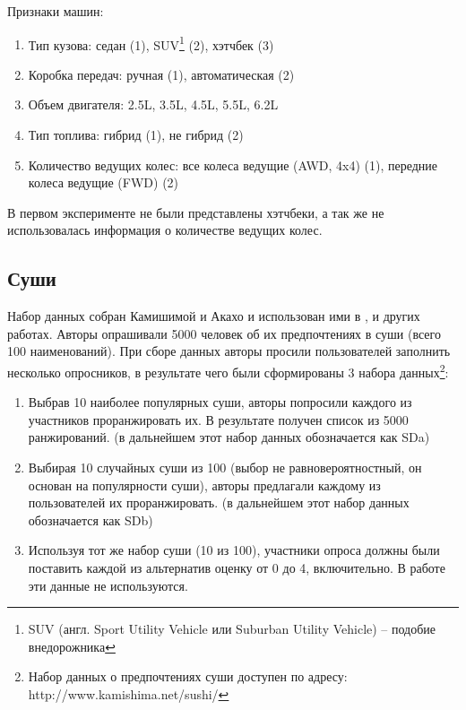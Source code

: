 		\vspace{1em}
		
		\noindent Признаки машин:
		\vspace{-0.7em}
		\begin{enumerate}[itemsep=-1.5mm]
			\item Тип кузова: седан (1), SUV\footnote{SUV (англ. Sport Utility Vehicle или Suburban Utility Vehicle) – подобие внедорожника} (2), хэтчбек (3)
			\item Коробка передач: ручная (1), автоматическая (2)
			\item Объем двигателя: 2.5L, 3.5L, 4.5L, 5.5L, 6.2L
			\item Тип топлива: гибрид (1), не гибрид (2)
			\item Количество ведущих колес: все колеса ведущие (AWD, 4x4) (1), передние колеса ведущие (FWD) (2)
		\end{enumerate} 
		В первом эксперименте не были представлены хэтчбеки, а так же не использовалась информация о количестве ведущих колес.
	
	\subsection{Суши}
		Набор данных собран Камишимой и Акахо и использован ими в \cite{Kamishima:2003}, \cite{Kamishima:2006} и других работах. Авторы опрашивали 5000 человек об их предпочтениях в суши (всего 100 наименований). При сборе данных авторы просили пользователей заполнить несколько опросников, в результате чего были сформированы 3 набора данных\footnote{Набор данных о предпочтениях суши доступен по адресу: http://www.kamishima.net/sushi/}:
		\begin{enumerate}[itemsep=-1.5mm]
			\item Выбрав 10 наиболее популярных суши, авторы попросили каждого из участников проранжировать их. В результате получен список из 5000 ранжирований. (в дальнейшем этот набор данных обозначается как SDa)
			\item Выбирая 10 случайных суши из 100 (выбор не равновероятностный, он основан на популярности суши), авторы предлагали каждому из пользователей их проранжировать. (в дальнейшем этот набор данных обозначается как SDb)
			\item Используя тот же набор суши (10 из 100), участники опроса должны были поставить каждой из альтернатив оценку от 0 до 4, включительно. В работе эти данные не используются.
		\end{enumerate}
		
